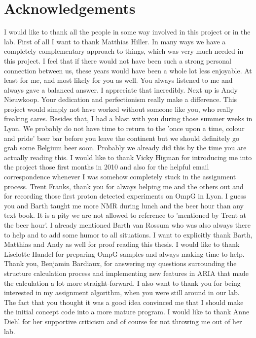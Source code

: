 
\frontmatter

\chapter*{Acknowledgements}



I would like to thank all the people in some way involved in this project or in the lab. First of all I want to thank Matthias Hiller. In many ways we have a completely complementary approach to things, which was very much needed in this project. I feel that if there would not have been such a strong personal connection between us, these years would have been a whole lot less enjoyable. At least for me, and most likely for you as well. You always listened to me and always gave a balanced answer. I appreciate that incredibly. Next up is Andy Nieuwkoop. Your dedication and perfectionism really make a difference. This project would simply not have worked without someone like you, who really freaking cares. Besides that, I had a blast with you during those summer weeks in Lyon. We probably do not have time to return to the 'once upon a time, colour and pride' beer bar before you leave the continent but we should definitely go grab some Belgium beer soon. Probably we already did this by the time you are actually reading this. I would like to thank Vicky Higman for introducing me into the project those first months in 2010 and also for the helpful email correspondence whenever I was somehow completely stuck in the assignment process. Trent Franks, thank you for always helping me and the others out and for recording those first proton detected experiments on OmpG in Lyon. I guess you and Barth taught me more NMR during lunch and the beer hour than any text book. It is a pity we are not allowed to reference to 'mentioned by Trent at the beer hour'. I already mentioned Barth van Rossum who was also always there to help and to add some humor to all situations. I want to explicitly thank Barth, Matthias and Andy as well for proof reading this thesis. I would like to thank Liselotte Handel for preparing OmpG samples and always making time to help. Thank you, Benjamin Bardiaux, for answering my questions surrounding the structure calculation process and implementing new features in ARIA that made the calculation a lot more straight-forward. I also want to thank you for being interested in my assignment algorithm, when you were still around in our lab. The fact that you thought it was a good idea convinced me that I should make the initial concept code into a more mature program. I would like to thank Anne Diehl for her supportive criticism and of course for not throwing me out of her lab.

